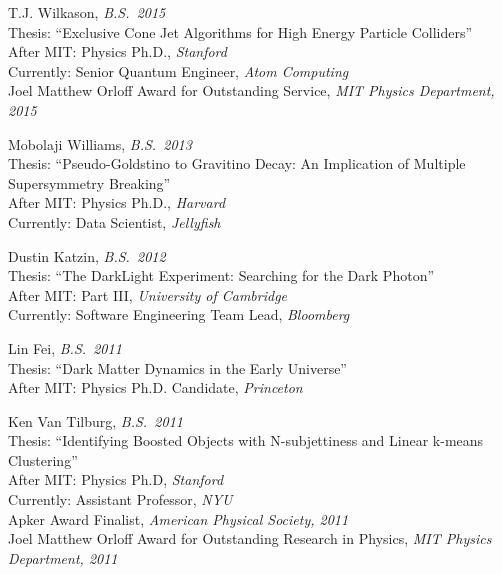 \item T.J. Wilkason, \emph{B.S.~2015}
\\ Thesis: ``Exclusive Cone Jet Algorithms for High Energy Particle Colliders''
\\ After MIT: Physics Ph.D., \emph{Stanford}
\\ Currently: Senior Quantum Engineer, \emph{Atom Computing}
\\ Joel Matthew Orloff Award for Outstanding Service, \emph{MIT Physics Department, 2015}

\item Mobolaji Williams, \emph{B.S.~2013}
\\ Thesis: ``Pseudo-Goldstino to Gravitino Decay: An Implication of Multiple Supersymmetry Breaking''
\\ After MIT: Physics Ph.D., \emph{Harvard}
\\ Currently: Data Scientist, \emph{Jellyfish}

\item Dustin Katzin, \emph{B.S.~2012}
\\ Thesis: ``The DarkLight Experiment: Searching for the Dark Photon''
\\ After MIT: Part III, \emph{University of Cambridge}
\\ Currently: Software Engineering Team Lead, \emph{Bloomberg}

\item Lin Fei, \emph{B.S.~2011}
\\ Thesis: ``Dark Matter Dynamics in the Early Universe''
\\ After MIT: Physics Ph.D. Candidate, \emph{Princeton}

\item Ken Van Tilburg, \emph{B.S.~2011}
\\ Thesis: ``Identifying Boosted Objects with N-subjettiness and Linear k-means Clustering''
\\ After MIT: Physics Ph.D, \emph{Stanford}
\\ Currently: Assistant Professor, \emph{NYU}
\\ Apker Award Finalist, \emph{American Physical Society, 2011}
\\ Joel Matthew Orloff Award for Outstanding Research in Physics, \emph{MIT Physics Department, 2011}

\el
